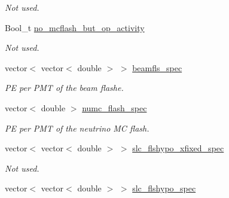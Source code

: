 \begin{DoxyCompactItemize}
\begin{DoxyCompactList}\small\item\em Not used. \end{DoxyCompactList}\item 
\hypertarget{classUBXSecEvent_a04fd3fd872cbe4f19ea0c438214ee854}{Bool\-\_\-t \hyperlink{classUBXSecEvent_a04fd3fd872cbe4f19ea0c438214ee854}{no\-\_\-mcflash\-\_\-but\-\_\-op\-\_\-activity}}\label{classUBXSecEvent_a04fd3fd872cbe4f19ea0c438214ee854}

\begin{DoxyCompactList}\small\item\em Not used. \end{DoxyCompactList}\item 
\hypertarget{classUBXSecEvent_a672e817e5a574c0a1ff50ec81862bc1f}{vector$<$ vector$<$ double $>$ $>$ \hyperlink{classUBXSecEvent_a672e817e5a574c0a1ff50ec81862bc1f}{beamfls\-\_\-spec}}\label{classUBXSecEvent_a672e817e5a574c0a1ff50ec81862bc1f}

\begin{DoxyCompactList}\small\item\em P\-E per P\-M\-T of the beam flashe. \end{DoxyCompactList}\item 
\hypertarget{classUBXSecEvent_aa51dba44fd0d9dcfbeb4c455b73debbd}{vector$<$ double $>$ \hyperlink{classUBXSecEvent_aa51dba44fd0d9dcfbeb4c455b73debbd}{numc\-\_\-flash\-\_\-spec}}\label{classUBXSecEvent_aa51dba44fd0d9dcfbeb4c455b73debbd}

\begin{DoxyCompactList}\small\item\em P\-E per P\-M\-T of the neutrino M\-C flash. \end{DoxyCompactList}\item 
\hypertarget{classUBXSecEvent_aff42f5975ca8b7c22f21023ffe8cf2c9}{vector$<$ vector$<$ double $>$ $>$ \hyperlink{classUBXSecEvent_aff42f5975ca8b7c22f21023ffe8cf2c9}{slc\-\_\-flshypo\-\_\-xfixed\-\_\-spec}}\label{classUBXSecEvent_aff42f5975ca8b7c22f21023ffe8cf2c9}

\begin{DoxyCompactList}\small\item\em Not used. \end{DoxyCompactList}\item 
\hypertarget{classUBXSecEvent_aa82aa9b73994eae31d0f7ab0f47f23fa}{vector$<$ vector$<$ double $>$ $>$ \hyperlink{classUBXSecEvent_aa82aa9b73994eae31d0f7ab0f47f23fa}{slc\-\_\-flshypo\-\_\-spec}}\label{classUBXSecEvent_aa82aa9b73994eae31d0f7ab0f47f23fa}


\end{DoxyCompactItemize}
